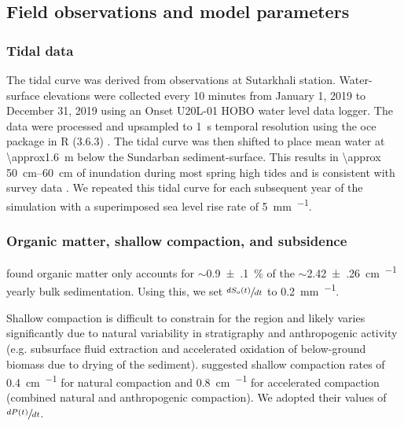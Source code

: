 \subsection{Field observations and model parameters}

\bigskip

\subsubsection*{Tidal data}

The tidal curve was derived from observations at Sutarkhali station. Water-surface elevations were collected every 10 minutes from January 1, 2019 to December 31, 2019 using an Onset U20L-01 HOBO water level data logger. The data were processed and upsampled to \SI{1}{\second} temporal resolution using the oce package in R (3.6.3) \citep{kelleyOceAnalysisOceanographic2020}. The tidal curve was then shifted to place mean water at \SI{\approx1.6}{\meter} below the Sundarban sediment-surface. This results in \SIrange{\approx 50}{60}{\centi\meter} of inundation during most spring high tides and is consistent with survey data \citep{auerbachFloodRiskNatural2015,haleSeasonalVariabilityForces2019,bomerSurfaceElevationSedimentation2020}. We repeated this tidal curve for each subsequent year of the simulation with a superimposed sea level rise rate of \SI{5}{\milli\meter\per\year}.

\subsubsection*{Organic matter, shallow compaction, and subsidence}

\citet{bomerProcessControlsLive2020} found organic matter only accounts for $\sim$\SI{0.9(1)}{\percent} of the $\sim$\SI{2.42(26)}{\centi\meter\per\year} yearly bulk sedimentation. Using this, we set $\sfrac{dS_o(t)}{dt}$ to \SI{0.2}{\milli\meter\per\year}.

Shallow compaction is difficult to constrain for the region and likely varies significantly due to natural variability in stratigraphy and anthropogenic activity (e.g. subsurface fluid extraction and accelerated oxidation of below-ground biomass due to drying of the sediment). \citet{auerbachFloodRiskNatural2015} suggested shallow compaction rates of \SI{0.4}{\centi\meter\per\year} for natural compaction and \SI{0.8}{\centi\meter\per\year} for accelerated compaction (combined natural and anthropogenic compaction). We adopted their values of $\sfrac{dP(t)}{dt}$.

